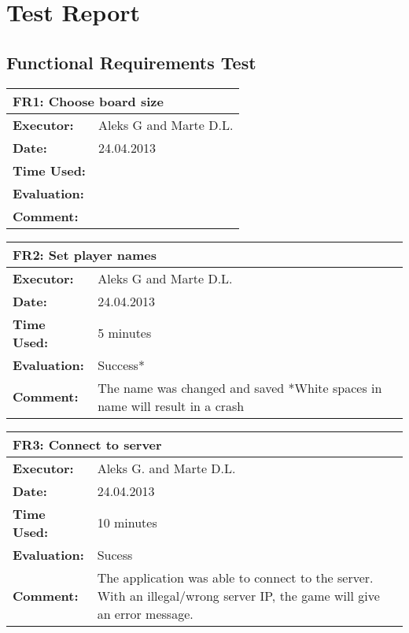 \section{Test Report}
\label{testreport}

\subsection{Functional Requirements Test}

\begin{tabular}{|m{}||m{}|}
\hline
\multicolumn{2}{|l|}{FR1: Choose board size} \\ \hline
\textbf{Executor:} & Aleks G and Marte D.L.\\ \hline
\textbf{Date:} & 24.04.2013\\ \hline
\textbf{Time Used:} & \\ \hline
\textbf{Evaluation:} & \\ \hline
\textbf{Comment:} & \\ \hline
\end{tabular}

\begin{tabular}{|m{}||m{}|}
\hline
\multicolumn{2}{|l|}{FR2: Set player names} \\ \hline
\textbf{Executor:} & Aleks G and Marte D.L.\\ \hline
\textbf{Date:} & 24.04.2013\\ \hline
\textbf{Time Used:} & 5 minutes\\ \hline
\textbf{Evaluation:} & Success*\\ \hline
\textbf{Comment:} & The name was changed and saved
*White spaces in name will result in a crash\\ \hline
\end{tabular}

\begin{tabular}{|m{}||m{}|}
\hline
\multicolumn{2}{|l|}{FR3: Connect to server} \\ \hline
\textbf{Executor:} & Aleks G. and Marte D.L.\\ \hline
\textbf{Date:} & 24.04.2013\\ \hline
\textbf{Time Used:} & 10 minutes\\ \hline
\textbf{Evaluation:} & Sucess\\ \hline
\textbf{Comment:} & The application was able to connect to the server. With an illegal/wrong server IP, the game will give an error message.\\ \hline
\end{tabular}

